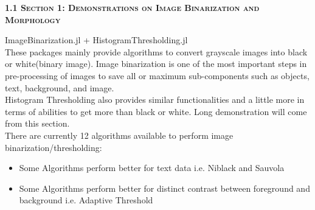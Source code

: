 



\vspace{0.5cm}
\Large
\textbf{\textsc{1.1 Section 1: Demonstrations on Image Binarization and Morphology}}


\vspace{0.5cm}
\Large
\textsf{ImageBinarization.jl + HistogramThresholding.jl}\\

\vspace{0.5cm}
\large
These packages mainly provide algorithms to convert grayscale images into black\\ or white(binary image). Image binarization is one of the most important steps in \\pre-processing of images to save all or maximum sub-components such as objects, text, background, and image.\\
Histogram Thresholding also provides similar functionalities and a little more in terms of abilities to get more than black or white. Long demonstration will come from this section.
\\
There are currently 12 algorithms available to perform image binarization/thresholding:
\begin{itemize}[noitemsep,topsep=0pt]
    \item Some Algorithms perform better for text data i.e. Niblack and Sauvola
    \item Some Algorithms perform better for distinct contrast between foreground and background i.e. Adaptive Threshold
\end{itemize}

